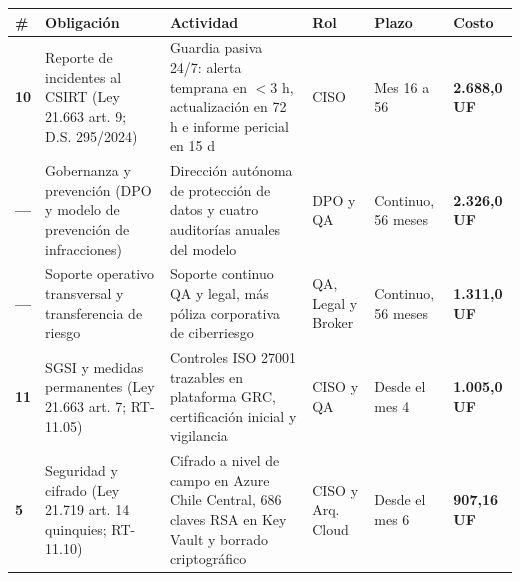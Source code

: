 {\def\LTcaptype{none} %
\begin{longtable}[]{@{}
  >{\centering\arraybackslash}p{}
  >{\raggedright\arraybackslash}p{}
  >{\raggedright\arraybackslash}p{}
  >{\raggedright\arraybackslash}p{}
  >{\raggedright\arraybackslash}p{}
  >{\raggedleft\arraybackslash}p{}@{}}
\toprule\noalign{}
\begin{minipage}[b]{\linewidth}\centering
\#
\end{minipage} & \begin{minipage}[b]{\linewidth}\raggedright
Obligación
\end{minipage} & \begin{minipage}[b]{\linewidth}\raggedright
Actividad
\end{minipage} & \begin{minipage}[b]{\linewidth}\raggedright
Rol
\end{minipage} & \begin{minipage}[b]{\linewidth}\raggedright
Plazo
\end{minipage} & \begin{minipage}[b]{\linewidth}\raggedleft
Costo
\end{minipage} \\
\midrule\noalign{}
\endhead
\bottomrule\noalign{}
\endlastfoot
\textbf{10} & Reporte de incidentes al CSIRT (Ley 21.663 art. 9; D.S. 295/2024) & Guardia pasiva 24/7: alerta temprana en \(<3\) h, actualización en 72 h e informe pericial en 15 d & CISO & Mes 16 a 56 & \textbf{2.688,0 UF} \\
\textbf{---} & Gobernanza y prevención (DPO y modelo de prevención de infracciones) & Dirección autónoma de protección de datos y cuatro auditorías anuales del modelo & DPO y QA & Continuo, 56 meses & \textbf{2.326,0 UF} \\
\textbf{---} & Soporte operativo transversal y transferencia de riesgo & Soporte continuo QA y legal, más póliza corporativa de ciberriesgo & QA, Legal y Broker & Continuo, 56 meses & \textbf{1.311,0 UF} \\
\textbf{11} & SGSI y medidas permanentes (Ley 21.663 art. 7; RT-11.05) & Controles ISO 27001 trazables en plataforma GRC, certificación inicial y vigilancia & CISO y QA & Desde el mes 4 & \textbf{1.005,0 UF} \\
\textbf{5} & Seguridad y cifrado (Ley 21.719 art. 14 quinquies; RT-11.10) & Cifrado a nivel de campo en Azure Chile Central, 686 claves RSA en Key Vault y borrado criptográfico & CISO y Arq. Cloud & Desde el mes 6 & \textbf{907,16 UF} \\
\end{longtable}
}

